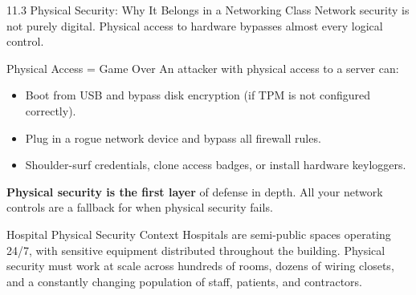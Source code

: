 \documentclass[aspectratio=169]{beamer}  %
\begin{document}
\begin{frame}{11.3 Physical Security: Why It Belongs in a Networking Class}
    \footnotesize
    Network security is not purely digital. Physical access to hardware bypasses almost every logical control.

    \vspace{0.3em}
    \begin{alertblock}{Physical Access = Game Over}
        \footnotesize
        An attacker with physical access to a server can:
        \begin{itemize}
            \item Boot from USB and bypass disk encryption (if TPM is not configured correctly).
            \item Plug in a rogue network device and bypass all firewall rules.
            \item Shoulder-surf credentials, clone access badges, or install hardware keyloggers.
        \end{itemize}
        \textbf{Physical security is the first layer} of defense in depth. All your network controls are a fallback for when physical security fails.
    \end{alertblock}

    \begin{exampleblock}{Hospital Physical Security Context}
        \footnotesize
        Hospitals are semi-public spaces operating 24/7, with sensitive equipment distributed throughout the building. Physical security must work at scale across hundreds of rooms, dozens of wiring closets, and a constantly changing population of staff, patients, and contractors.
    \end{exampleblock}
\end{frame}
\end{document}
